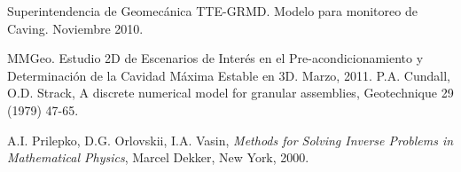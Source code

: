 
\begin{thebibliography}{99}

	 Superintendencia de Geomec\'anica TTE-GRMD. Modelo para monitoreo de Caving. Noviembre 2010. 
	
	 MMGeo. Estudio 2D de Escenarios de Inter\'es en el Pre-acondicionamiento y Determinaci\'on de la Cavidad M\'axima Estable en 3D. Marzo, 2011.
	 P.A. Cundall, O.D. Strack, A discrete numerical model for granular assemblies, Geotechnique 29 (1979) 47-65.

   A.I. Prilepko, D.G. Orlovskii, I.A. Vasin, {\em Methods for Solving Inverse Problems in Mathematical
Physics}, Marcel Dekker, New York, 2000.









\end{thebibliography}